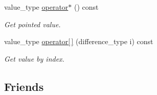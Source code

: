 \begin{DoxyCompactItemize}
value\+\_\+type \hyperlink{struct_mdt_1_1_plain_text_1_1_string_const_iterator_ad23073b28d2844ad3e3555608e4a9bd5}{operator$\ast$} () const 
\begin{DoxyCompactList}\small\item\em Get pointed value. \end{DoxyCompactList}\item 
value\+\_\+type \hyperlink{struct_mdt_1_1_plain_text_1_1_string_const_iterator_a8a9673923bfd2e0af6f31b9f98ef8f46}{operator\mbox{[}$\,$\mbox{]}} (difference\+\_\+type i) const 
\begin{DoxyCompactList}\small\item\em Get value by index. \end{DoxyCompactList}\end{DoxyCompactItemize}
\subsection*{Friends}
